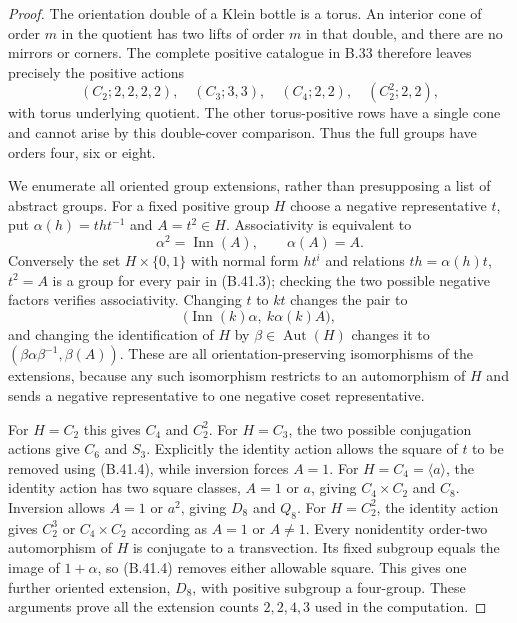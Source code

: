 \begin{proof}
The orientation double of a Klein bottle is a torus.
An interior cone of order $m$ in the quotient has two lifts of
order $m$ in that double, and there are no mirrors or corners.
The complete positive catalogue in B.33 therefore leaves
precisely the positive actions
\[
 (C_2;2,2,2,2),\quad(C_3;3,3),\quad
 (C_4;2,2),\quad(C_2^2;2,2),                          \tag{B.41.2}
\]
with torus underlying quotient.
The other torus-positive rows have a single cone and cannot
arise by this double-cover comparison.
Thus the full groups have orders four, six or eight.

We enumerate all oriented group extensions, rather than
presupposing a list of abstract groups.
For a fixed positive group $H$ choose a negative representative
$t$, put $\alpha(h)=tht^{-1}$ and $A=t^2\in H$.
Associativity is equivalent to
\[
           \alpha^2=\operatorname{Inn}(A),
           \qquad\alpha(A)=A.                         \tag{B.41.3}
\]
Conversely the set $H\times\{0,1\}$ with normal form $ht^i$
and relations $th=\alpha(h)t$, $t^2=A$ is a group for every
pair in (B.41.3); checking the two possible negative factors
verifies associativity.  Changing $t$ to $kt$ changes the pair to
\[
 \bigl(\operatorname{Inn}(k)\alpha,\ k\alpha(k)A\bigr),
                                                        \tag{B.41.4}
\]
and changing the identification of $H$ by $\beta\in\operatorname{Aut}(H)$
changes it to
$(\beta\alpha\beta^{-1},\beta(A))$.
These are all orientation-preserving isomorphisms of the
extensions, because any such isomorphism restricts to an
automorphism of $H$ and sends a negative representative to
one negative coset representative.

For $H=C_2$ this gives $C_4$ and $C_2^2$.
For $H=C_3$, the two possible conjugation actions give $C_6$
and $S_3$.  Explicitly the identity action allows the square
of $t$ to be removed using (B.41.4), while inversion forces
$A=1$.
For $H=C_4=\langle a\rangle$, the identity action has two
square classes, $A=1$ or $a$, giving $C_4\times C_2$ and
$C_8$.  Inversion allows $A=1$ or $a^2$, giving $D_8$ and
$Q_8$.
For $H=C_2^2$, the identity action gives $C_2^3$ or
$C_4\times C_2$ according as $A=1$ or $A\ne1$.
Every nonidentity order-two automorphism of $H$ is conjugate
to a transvection.  Its fixed subgroup equals the image of
$1+\alpha$, so (B.41.4) removes either allowable square.
This gives one further oriented extension, $D_8$, with positive
subgroup a four-group.  These arguments prove all the extension
counts $2,2,4,3$ used in the computation.


\end{proof}
